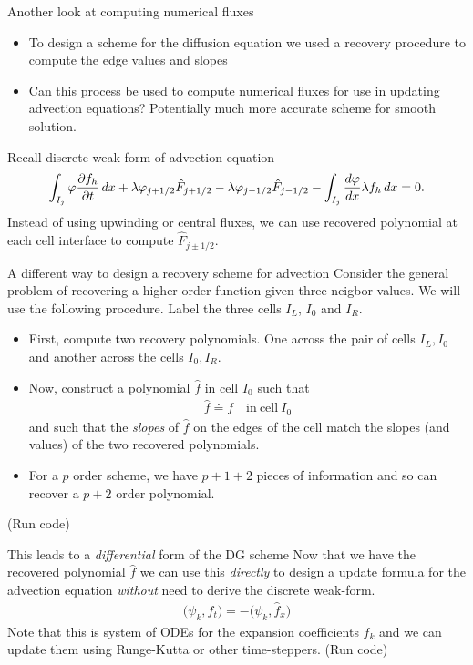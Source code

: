 \documentclass[pdf]{beamer}
\newcommand{\pfrac}[2]{\frac{\partial #1}{\partial #2}}
\newcommand{\mypause}{}
\theoremstyle{definition}
\begin{document}
\begin{frame}{Another look at computing numerical fluxes}
  \begin{itemize}
  \item To design a scheme for the diffusion equation we used a
    recovery procedure to compute the edge values and slopes
  \item Can this process be used to compute numerical fluxes for use
    in updating advection equations? Potentially much more accurate
    scheme for smooth solution.
  \end{itemize}
  \mypause
  Recall discrete weak-form of advection equation
  \begin{align*}
    \int_{I_j} \varphi \pfrac{f_h}{t}\thinspace dx
    +
    \lambda \varphi_{j+1/2}\hat{F}_{j+1/2} - \lambda \varphi_{j-1/2}\hat{F}_{j-1/2}
    -
    \int_{I_j}  \frac{d\varphi}{dx}\lambda f_h\thinspace dx = 0.
  \end{align*}
  Instead of using upwinding or central fluxes, we can use recovered
  polynomial at each cell interface to compute $\hat{F}_{j \pm 1/2}$.
\end{frame}

\begin{frame}{A different way to design a recovery scheme for
    advection}
  Consider the general problem of recovering a higher-order function
  given three neigbor values. We will use the following
  procedure. Label the three cells $I_L$, $I_0$ and $I_R$.
  \begin{itemize}
  \item First, compute two recovery polynomials. One across the pair
    of cells $I_L, I_0$ and another across the cells $I_0,I_R$.
  \item Now, construct a polynomial $\hat{f}$ in cell $I_0$ such that
    \begin{align*}
      \hat{f} \doteq f \quad\mathrm{in\ cell }\ I_0
    \end{align*}
    and such that the \emph{slopes} of $\hat{f}$ on the edges of the
    cell match the slopes (and values) of the two recovered
    polynomials.
  \item For a $p$ order scheme, we have $p+1+2$ pieces of information
    and so can recover a $p+2$ order polynomial.
  \end{itemize}
  (Run code)
\end{frame}

\begin{frame}{This leads to a \emph{differential} form of the DG scheme}
  Now that we have the recovered polynomial $\hat{f}$ we can use this
  \emph{directly} to design a update formula for the advection
  equation \emph{without} need to derive the discrete weak-form.
  \begin{align*}
    \big(\psi_k, f_t \big) = - \big(\psi_k, \hat{f}_x \big)
  \end{align*}
  Note that this is system of ODEs for the expansion coefficients
  $f_k$ and we can update them using Runge-Kutta or other
  time-steppers. (Run code)
\end{frame}
\end{document}

